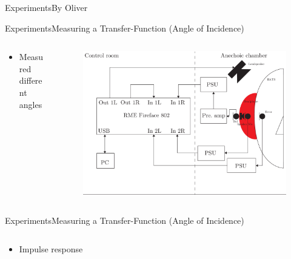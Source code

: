 \begin{frame}{Experiments}{By Oliver}
\begin{frame}{Experiments}{Measuring a Transfer-Function (Angle of Incidence)}		
	\begin{columns}
		\begin{column}{0.3\textwidth}
			\begin{itemize}
				\item Measured different angles
			\end{itemize}
		\end{column}
		\begin{column}{0.7\textwidth} 
			\begin{figure}[h]
				\includegraphics[width=1\textwidth]{figures/AngleOfIncidenceSetup.pdf}
			\end{figure}
		\end{column}
	\end{columns}
\end{frame}
\begin{frame}{Experiments}{Measuring a Transfer-Function (Angle of Incidence)}
	\begin{columns}
	\begin{column}{1\textwidth}
		\begin{itemize}
			\item Impulse response
		\end{itemize}
		\begin{figure}[h]
			
		\end{figure}
	\end{column}
\end{columns}
\end{frame}


\end{frame}
